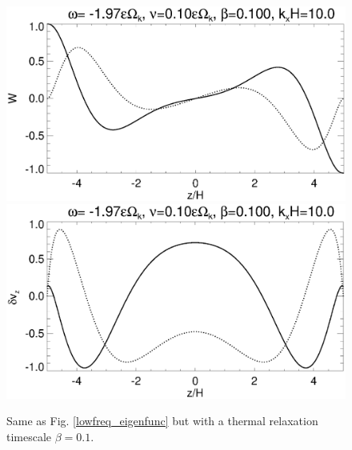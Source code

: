 \begin{figure}
  \includegraphics[width=\linewidth,clip=true,trim=0cm 1.75cm 0cm
  0cm]{figures/eigenvectorW_beta0d1} 
  \includegraphics[width=\linewidth,clip=true,trim=0cm 0cm 0cm
  1cm]{figures/eigenvectorvz_beta0d1}
  \caption{Same as Fig. \ref{lowfreq_eigenfunc} but with a
    thermal relaxation timescale $\beta=0.1$. 
    \label{lowfreq_eigenfunc_cool}
  }
\end{figure}

